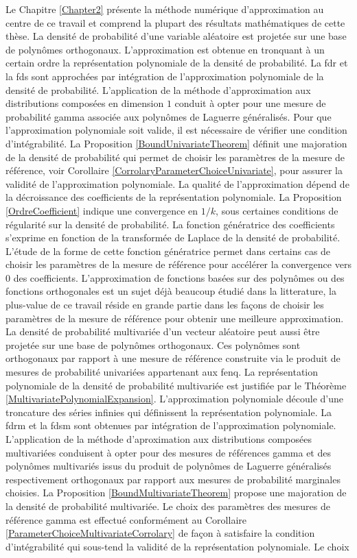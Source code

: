 Le Chapitre \ref{Chapter2} présente la méthode numérique d'approximation au centre de ce travail et comprend la plupart des résultats mathématiques de cette thèse. La densité de probabilité d\rq{}une variable aléatoire est projetée sur une base de polynômes orthogonaux. L\rq{}approximation est obtenue en tronquant à un certain ordre la représentation polynomiale de la densité de probabilité. La \gls{fdr} et la \gls{fds} sont approchées par intégration de l\rq{}approximation polynomiale de la densité de probabilité. L\rq{}application de la méthode d\rq{}approximation aux distributions composées en dimension $1$ conduit à opter pour une mesure de probabilité gamma associée aux polynômes de Laguerre généralisés. Pour que l\rq{}approximation polynomiale soit valide, il est nécessaire de vérifier une condition d\rq{}intégrabilité. La Proposition \ref{BoundUnivariateTheorem} définit une majoration de la densité de probabilité qui permet de choisir les paramètres de la mesure de référence, voir Corollaire \ref{CorrolaryParameterChoiceUnivariate}, pour assurer la validité de l\rq{}approximation polynomiale. La qualité de l\rq{}approximation dépend de la décroissance des coefficients de la représentation polynomiale. La Proposition \ref{OrdreCoefficient} indique une convergence en $1/k$, sous certaines conditions de régularité sur la densité de probabilité. La fonction génératrice des coefficients s\rq{}exprime en fonction de la transformée de Laplace de la densité de probabilité. L\rq{}étude de la forme de cette fonction génératrice permet dans certains cas de choisir les paramètres de la mesure de référence pour accélérer la convergence vers $0$ des coefficients. L\rq{}approximation de fonctions basées sur des polynômes ou des fonctions orthogonales est un sujet déjà beaucoup étudié dans la litterature, la plus-value de ce travail réside en grande partie dans les façons de choisir les paramètres de la mesure de référence pour obtenir une meilleure approximation. La densité de probabilité multivariée d\rq{}un vecteur aléatoire peut aussi être projetée sur une base de polynômes orthogonaux. Ces polynômes sont orthogonaux par rapport à une mesure de référence construite via le produit de mesures de probabilité univariées appartenant aux \gls{fenq}. La représentation polynomiale de la densité de probabilité multivariée est justifiée par le Théorème \ref{MultivariatePolynomialExpansion}. L\rq{}approximation polynomiale découle d\rq{}une troncature des séries infinies qui définissent la représentation polynomiale. La \gls{fdrm} et la \gls{fdsm} sont obtenues par intégration de l\rq{}approximation polynomiale. L\rq{}application de la méthode d\rq{}aproximation aux distributions composées multivariées conduisent à opter pour des mesures de références gamma et des polynômes multivariés issus du produit de polynômes de Laguerre généralisés respectivement orthogonaux par rapport aux mesures de probabilité marginales choisies. La Proposition \ref{BoundMultivariateTheorem} propose une majoration de la densité de probabilité multivariée. Le choix des paramètres des mesures de référence gamma est effectué conformément au Corollaire \ref{ParameterChoiceMultivariateCorrolary} de façon à satisfaire la condition d\rq{}intégrabilité qui sous-tend la validité de la représentation polynomiale. Le choix 